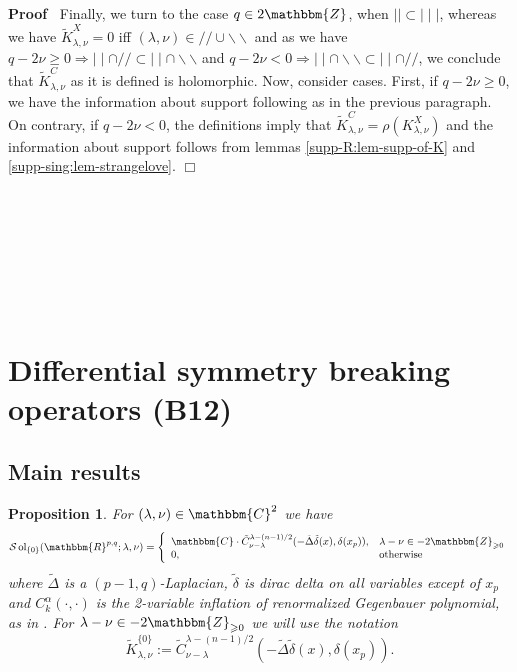 \documentclass{article}
\newcommand{\assign}{:=}
\newcommand{\tmop}[1]{\ensuremath{\operatorname{#1}}}
\renewenvironment{proof}{\noindent\textbf{Proof\ }}{\hspace*{\fill}$\Box$\medskip}
\newtheorem{proposition}{Proposition}[section]
\theoremstyle{remark}
\begin{document}
\begin{proof}
  Finally, we turn to the case $q \in 2\mathbbm{Z}$, when $\mid \mid \subset
  \mid \mid \mid$, whereas we have $\tilde{K}_{\lambda, \nu}^X = 0$ iff
  $(\lambda, \nu) \in / / \cup \backslash\backslash$ and as we have $q - 2 \nu
  \geqslant 0 \Rightarrow \mid \mid \cap / / \subset \mid \mid \cap
  \backslash\backslash$ and $q - 2 \nu < 0 \Rightarrow \mid \mid \cap
  \backslash\backslash \subset \mid \mid \cap / /$, we conclude that
  $\tilde{K}_{\lambda, \nu}^C$ as it is defined is holomorphic. Now, consider
  cases. First, if $q - 2 \nu \geqslant 0$, we have the information about
  support following as in the previous paragraph. On contrary, if $q - 2 \nu <
  0$, the definitions imply that $\tilde{K}_{\lambda, \nu}^C = \rho
  (K_{\lambda, \nu}^X)$ and the information about support follows from lemmas
  \ref{supp-R:lem-supp-of-K} and \ref{supp-sing:lem-strangelove}.
\end{proof}

\

\

\

\

\section{Differential symmetry breaking operators (B12)}\label{sec:diffSBO}

\subsection{Main results}

\begin{proposition}
  \label{diffSBO:prop-main}For $(\lambda, \nu) \in \mathbbm{C}^2$ we have
  \[ \mathcal{S} \tmop{ol}_{\{ 0 \}} (\mathbbm{R}^{p, q} ; \lambda, \nu) =
     \left\{ \begin{array}{ll}
       \mathbbm{C} \cdot \tilde{C}_{\nu - \lambda}^{\lambda - (n - 1) / 2} (-
       \tilde{\Delta} \tilde{\delta} (x), \delta (x_p)), & \lambda - \nu \in -
       2\mathbbm{Z}_{\geqslant 0}\\
       0, & \tmop{otherwise}
     \end{array} \right. \]
  where $\tilde{\Delta}$ is a $(p - 1, q)$-Laplacian, $\tilde{\delta}$ is
  dirac delta on all variables except of $x_p$ and $C^{\alpha}_k (\cdot,
  \cdot)$ is the 2-variable inflation of renormalized Gegenbauer polynomial,
  as in {\cite[(16.3)]{kobayashi2015symmetry}}. For $\lambda - \nu \in -
  2\mathbbm{Z}_{\geqslant 0}$ we will use the notation
  \[ \tilde{K}_{\lambda, \nu}^{\{ 0 \}} \assign \tilde{C}_{\nu -
     \lambda}^{\lambda - (n - 1) / 2} (- \tilde{\Delta} \tilde{\delta} (x),
     \delta (x_p)) . \]
\end{proposition}
\end{document}
